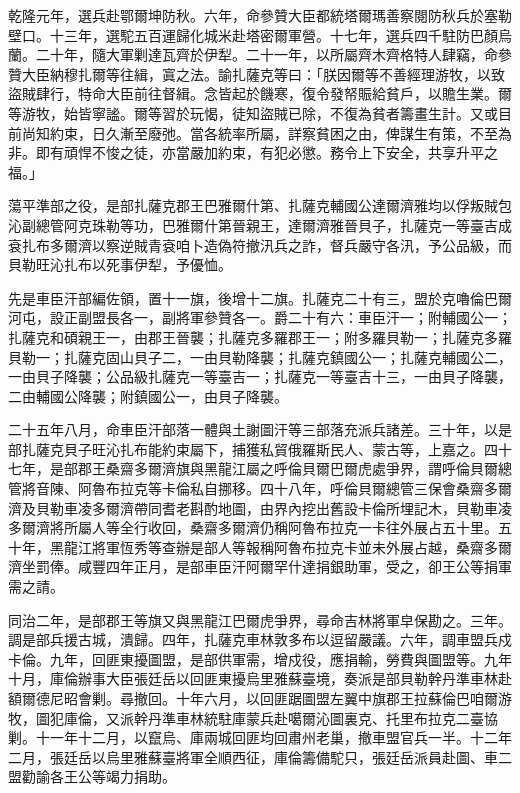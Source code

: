 \begin{pinyinscope}
乾隆元年，選兵赴鄂爾坤防秋。六年，命參贊大臣都統塔爾瑪善察閱防秋兵於塞勒壁口。十三年，選駝五百運歸化城米赴塔密爾軍營。十七年，選兵四千駐防巴顏烏蘭。二十年，隨大軍剿達瓦齊於伊犁。二十一年，以所屬齊木齊格特人肆竊，命參贊大臣納穆扎爾等往緝，寘之法。諭扎薩克等曰：「朕因爾等不善經理游牧，以致盜賊肆行，特命大臣前往督緝。念皆起於饑寒，復令發帑賑給貧戶，以贍生業。爾等游牧，始皆寧謐。爾等習於玩愒，徒知盜賊已除，不復為貧者籌畫生計。又或目前尚知約束，日久漸至廢弛。當各統率所屬，詳察貧困之由，俾謀生有策，不至為非。即有頑悍不悛之徒，亦當嚴加約束，有犯必懲。務令上下安全，共享升平之福。」

蕩平準部之役，是部扎薩克郡王巴雅爾什第、扎薩克輔國公達爾濟雅均以俘叛賊包沁副總管阿克珠勒等功，巴雅爾什第晉親王，達爾濟雅晉貝子，扎薩克一等臺吉成袞扎布多爾濟以察逆賊青袞咱卜造偽符撤汛兵之詐，督兵嚴守各汛，予公品級，而貝勒旺沁扎布以死事伊犁，予優恤。

先是車臣汗部編佐領，置十一旗，後增十二旗。扎薩克二十有三，盟於克嚕倫巴爾河屯，設正副盟長各一，副將軍參贊各一。爵二十有六：車臣汗一；附輔國公一；扎薩克和碩親王一，由郡王晉襲；扎薩克多羅郡王一；附多羅貝勒一；扎薩克多羅貝勒一；扎薩克固山貝子二，一由貝勒降襲；扎薩克鎮國公一；扎薩克輔國公二，一由貝子降襲；公品級扎薩克一等臺吉一；扎薩克一等臺吉十三，一由貝子降襲，二由輔國公降襲；附鎮國公一，由貝子降襲。

二十五年八月，命車臣汗部落一體與土謝圖汗等三部落充派兵諸差。三十年，以是部扎薩克貝子旺沁扎布能約束屬下，捕獲私貿俄羅斯民人、蒙古等，上嘉之。四十七年，是部郡王桑齋多爾濟旗與黑龍江屬之呼倫貝爾巴爾虎處爭界，謂呼倫貝爾總管將音陳、阿魯布拉克等卡倫私自挪移。四十八年，呼倫貝爾總管三保會桑齋多爾濟及貝勒車凌多爾濟帶同耆老斟酌地圖，由界內挖出舊設卡倫所埋記木，貝勒車凌多爾濟將所屬人等全行收回，桑齋多爾濟仍稱阿魯布拉克一卡往外展占五十里。五十年，黑龍江將軍恆秀等查辦是部人等報稱阿魯布拉克卡並未外展占越，桑齋多爾濟坐罰俸。咸豐四年正月，是部車臣汗阿爾罕什達捐銀助軍，受之，卻王公等捐軍需之請。

同治二年，是部郡王等旗又與黑龍江巴爾虎爭界，尋命吉林將軍皁保勘之。三年。調是部兵援古城，潰歸。四年，扎薩克車林敦多布以逗留嚴議。六年，調車盟兵戍卡倫。九年，回匪東擾圖盟，是部供軍需，增戍役，應捐輸，勞費與圖盟等。九年十月，庫倫辦事大臣張廷岳以回匪東擾烏里雅蘇臺境，奏派是部貝勒幹丹準車林赴額爾德尼昭會剿。尋撤回。十年六月，以回匪踞圖盟左翼中旗郡王拉蘇倫巴咱爾游牧，圖犯庫倫，又派幹丹準車林統駐庫蒙兵赴噶爾沁圖裏克、托里布拉克二臺協剿。十一年十二月，以竄烏、庫兩城回匪均回肅州老巢，撤車盟官兵一半。十二年二月，張廷岳以烏里雅蘇臺將軍全順西征，庫倫籌備駝只，張廷岳派員赴圖、車二盟勸諭各王公等竭力捐助。


\end{pinyinscope}
